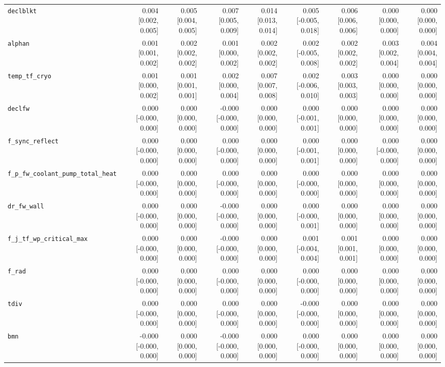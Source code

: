 \begin{tabular}{lrrrrrrrr}
\texttt{declblkt} & 0.004 [0.002, 0.005] & 0.005 [0.004, 0.005] & 0.007 [0.005, 0.009] & 0.014 [0.013, 0.014] & 0.005 [-0.005, 0.018] & 0.006 [0.006, 0.006] & 0.000 [0.000, 0.000] & 0.000 [0.000, 0.000] \\
\texttt{alphan} & 0.001 [0.001, 0.002] & 0.002 [0.002, 0.002] & 0.001 [0.000, 0.002] & 0.002 [0.002, 0.002] & 0.002 [-0.005, 0.008] & 0.002 [0.002, 0.002] & 0.003 [0.002, 0.004] & 0.004 [0.004, 0.004] \\
\texttt{temp\_tf\_cryo} & 0.001 [0.000, 0.002] & 0.001 [0.001, 0.001] & 0.002 [0.000, 0.004] & 0.007 [0.007, 0.008] & 0.002 [-0.006, 0.010] & 0.003 [0.003, 0.003] & 0.000 [0.000, 0.000] & 0.000 [0.000, 0.000] \\
\texttt{declfw} & 0.000 [-0.000, 0.000] & 0.000 [0.000, 0.000] & -0.000 [-0.000, 0.000] & 0.000 [0.000, 0.000] & 0.000 [-0.001, 0.001] & 0.000 [0.000, 0.000] & 0.000 [0.000, 0.000] & 0.000 [0.000, 0.000] \\
\texttt{f\_sync\_reflect} & 0.000 [-0.000, 0.000] & 0.000 [0.000, 0.000] & 0.000 [-0.000, 0.000] & 0.000 [0.000, 0.000] & 0.000 [-0.001, 0.001] & 0.000 [0.000, 0.000] & 0.000 [-0.000, 0.000] & 0.000 [0.000, 0.000] \\
\texttt{f\_p\_fw\_coolant\_pump\_total\_heat} & 0.000 [-0.000, 0.000] & 0.000 [0.000, 0.000] & 0.000 [-0.000, 0.000] & 0.000 [0.000, 0.000] & 0.000 [-0.000, 0.000] & 0.000 [0.000, 0.000] & 0.000 [0.000, 0.000] & 0.000 [0.000, 0.000] \\
\texttt{dr\_fw\_wall} & 0.000 [-0.000, 0.000] & 0.000 [0.000, 0.000] & -0.000 [-0.000, 0.000] & 0.000 [0.000, 0.000] & 0.000 [-0.000, 0.001] & 0.000 [0.000, 0.000] & 0.000 [0.000, 0.000] & 0.000 [0.000, 0.000] \\
\texttt{f\_j\_tf\_wp\_critical\_max} & 0.000 [-0.000, 0.000] & 0.000 [0.000, 0.000] & -0.000 [-0.000, 0.000] & 0.000 [0.000, 0.000] & 0.001 [-0.004, 0.004] & 0.001 [0.001, 0.001] & 0.000 [0.000, 0.000] & 0.000 [0.000, 0.000] \\
\texttt{f\_rad} & 0.000 [-0.000, 0.000] & 0.000 [0.000, 0.000] & 0.000 [-0.000, 0.000] & 0.000 [0.000, 0.000] & 0.000 [-0.000, 0.000] & 0.000 [0.000, 0.000] & 0.000 [0.000, 0.000] & 0.000 [0.000, 0.000] \\
\texttt{tdiv} & 0.000 [-0.000, 0.000] & 0.000 [0.000, 0.000] & 0.000 [-0.000, 0.000] & 0.000 [0.000, 0.000] & -0.000 [-0.000, 0.000] & 0.000 [0.000, 0.000] & 0.000 [0.000, 0.000] & 0.000 [0.000, 0.000] \\
\texttt{bmn} & -0.000 [-0.000, 0.000] & 0.000 [0.000, 0.000] & -0.000 [-0.000, 0.000] & 0.000 [0.000, 0.000] & 0.000 [-0.000, 0.000] & 0.000 [0.000, 0.000] & 0.000 [0.000, 0.000] & 0.000 [0.000, 0.000] \\

\end{tabular}
